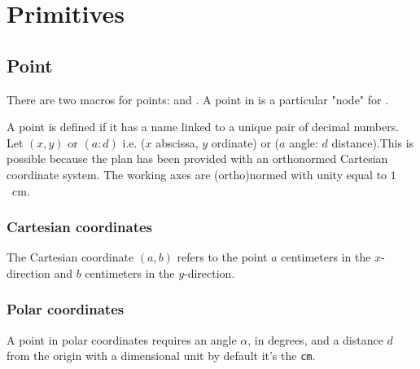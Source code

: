 \section{Primitives}

\subsection{Point}
There are two macros for points:   and . A point in \tkzname{\tkznameofpack} is a particular "node" for \TIKZ.

A point is defined if it has a name linked to a unique pair of decimal numbers. Let $(x,y)$ or $(a:d)$
i.e. ($x$ abscissa, $y$ ordinate) or  ($a$ angle: $d$ distance).This is possible because the plan has been provided with an orthonormed Cartesian coordinate system.
The working axes are  (ortho)normed with unity equal to $1$~cm.

\subsubsection{Cartesian coordinates}
The Cartesian coordinate $(a,b)$ refers to the point $a$ centimeters in the $x$-direction and $b$ centimeters
in the $y$-direction.

\begin{tkzexample}[latex=5cm,small]
\end{tkzexample}

\subsubsection{Polar coordinates}
A point in polar coordinates requires an angle $\alpha$, in degrees, and a distance  $d$ from the origin with
a dimensional unit by default it's the \texttt{cm}.

\begin{tkzexample}[latex=7cm,small]
\end{tkzexample}

